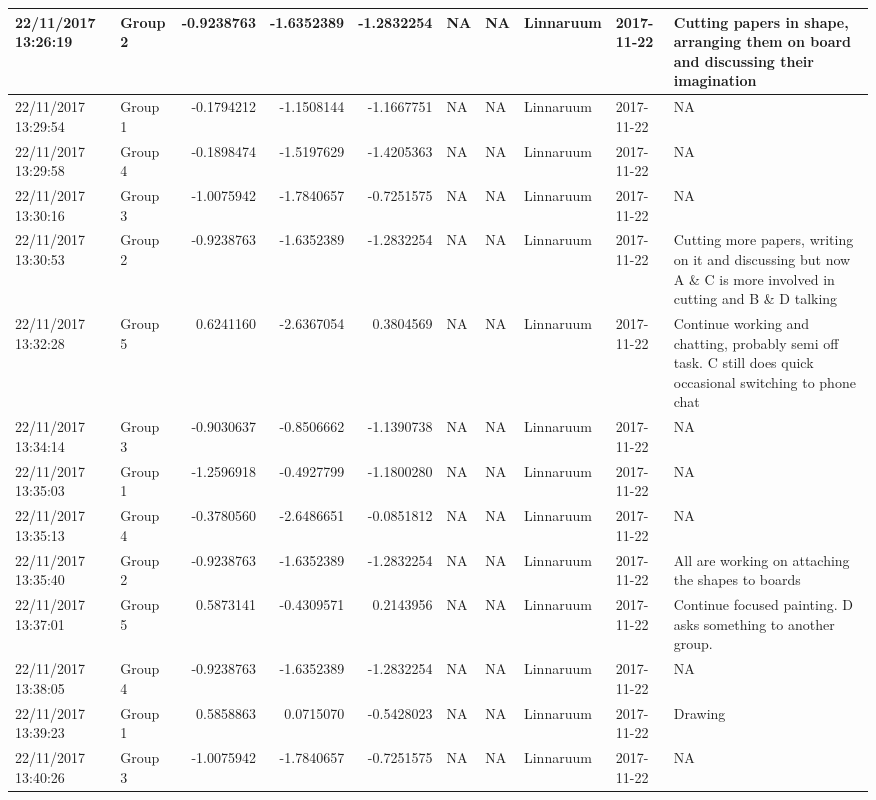 \documentclass[]{article}
\begin{document}
\begin{tabular}{l|l|r|r|r|l|l|l|l|l}
\hline
22/11/2017 13:26:19 & Group 2 & -0.9238763 & -1.6352389 & -1.2832254 & NA & NA & Linnaruum & 2017-11-22 & Cutting papers in shape, arranging them on board and discussing their imagination\\
\hline
22/11/2017 13:29:54 & Group 1 & -0.1794212 & -1.1508144 & -1.1667751 & NA & NA & Linnaruum & 2017-11-22 & NA\\
\hline
22/11/2017 13:29:58 & Group 4 & -0.1898474 & -1.5197629 & -1.4205363 & NA & NA & Linnaruum & 2017-11-22 & NA\\
\hline
22/11/2017 13:30:16 & Group 3 & -1.0075942 & -1.7840657 & -0.7251575 & NA & NA & Linnaruum & 2017-11-22 & NA\\
\hline
22/11/2017 13:30:53 & Group 2 & -0.9238763 & -1.6352389 & -1.2832254 & NA & NA & Linnaruum & 2017-11-22 & Cutting more papers, writing on it and discussing but now A \& C is more involved in cutting and B \& D talking\\
\hline
22/11/2017 13:32:28 & Group 5 & 0.6241160 & -2.6367054 & 0.3804569 & NA & NA & Linnaruum & 2017-11-22 & Continue working and chatting, probably semi off task. C still does quick occasional switching to phone chat\\
\hline
22/11/2017 13:34:14 & Group 3 & -0.9030637 & -0.8506662 & -1.1390738 & NA & NA & Linnaruum & 2017-11-22 & NA\\
\hline
22/11/2017 13:35:03 & Group 1 & -1.2596918 & -0.4927799 & -1.1800280 & NA & NA & Linnaruum & 2017-11-22 & NA\\
\hline
22/11/2017 13:35:13 & Group 4 & -0.3780560 & -2.6486651 & -0.0851812 & NA & NA & Linnaruum & 2017-11-22 & NA\\
\hline
22/11/2017 13:35:40 & Group 2 & -0.9238763 & -1.6352389 & -1.2832254 & NA & NA & Linnaruum & 2017-11-22 & All are working on attaching the shapes to boards\\
\hline
22/11/2017 13:37:01 & Group 5 & 0.5873141 & -0.4309571 & 0.2143956 & NA & NA & Linnaruum & 2017-11-22 & Continue focused painting. D asks something to another group.\\
\hline
22/11/2017 13:38:05 & Group 4 & -0.9238763 & -1.6352389 & -1.2832254 & NA & NA & Linnaruum & 2017-11-22 & NA\\
\hline
22/11/2017 13:39:23 & Group 1 & 0.5858863 & 0.0715070 & -0.5428023 & NA & NA & Linnaruum & 2017-11-22 & Drawing\\
\hline
22/11/2017 13:40:26 & Group 3 & -1.0075942 & -1.7840657 & -0.7251575 & NA & NA & Linnaruum & 2017-11-22 & NA\\

\end{tabular}
\end{document}
